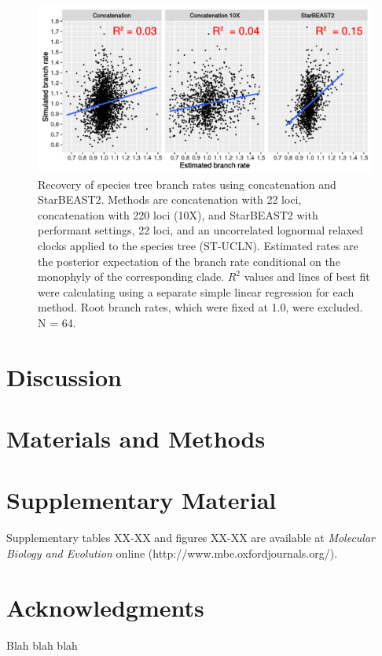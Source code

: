 \documentclass[12pt]{article}
\begin{document}
\begin{figure}[htb!]
\centering
\includegraphics[width=16cm]{branch_rates_lm.pdf}
\caption
{Recovery of species tree branch rates using concatenation and StarBEAST2.
Methods are concatenation with 22 loci, concatenation with 220 loci (10X), and
StarBEAST2 with performant settings, 22 loci, and an uncorrelated lognormal
relaxed clocks applied to the species tree (ST-UCLN). Estimated rates are the
posterior expectation of the branch rate conditional on the monophyly of the
corresponding clade. $R^2$ values and lines of best fit were calculating using a separate
simple linear regression for each method. Root branch rates, which were fixed at
1.0, were excluded. N = 64.}
\label{fig:branchRatesLM}
\end{figure}

\clearpage

\section{Discussion}


\section{Materials and Methods}


\section{Supplementary Material}
Supplementary tables XX-XX and figures XX-XX are available at \textit{Molecular Biology and Evolution} online (http://www.mbe.oxfordjournals.org/).


\section{Acknowledgments}
Blah blah blah




\end{document}
